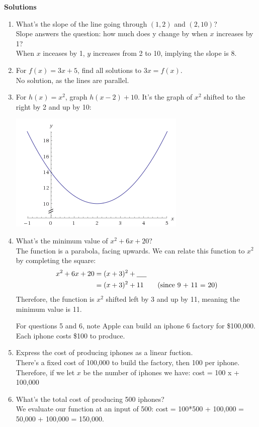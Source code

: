 \documentclass[a4paper, 12pt]{article}
\newcommand{\bt}[1]{\textbf{#1}} %
\newcommand{\eq}[1]{\begin{align*}#1\end{align*}} %
\renewcommand{\eq}[1]{\begin{align*}#1\end{align*}} %
\newcommand{\green}[1]{\textcolor{javagreen}{#1}} %
\begin{document}
\centerline{\bt{Solutions}}
\begin{enumerate}
    \item What's the slope of the line going through $(1, 2)$ and $(2, 10)$?\\
    \green{
    Slope answers the question: how much does y change by when $x$ increases by 1?\\
    When $x$ inceases by 1, $y$ increases from 2 to 10, implying the slope is 8.
    }

    \item For $f(x) = 3x + 5$, find all solutions to $3x = f(x)$. \\
    \green{
    No solution, as the lines are parallel.
    }
    \item For $h(x) = x^2$, graph $h(x-2) + 10$.
    \green{
    It's the graph of $x^2$ shifted to the right by 2 and up by 10:
    }

    \includegraphics{graphs/x2_right_up.png}
    \item What's the minimum value of $x^2 + 6x + 20$? \\
    \green{
    The function is a parabola, facing upwards. We can relate this function to $x^2$ by completing the square:
    \eq{
    x^2 + 6x + 20 & = (x+3)^2 + \text{\underline{\hspace{0.5cm}}} \\
    & = (x+3)^2 + 11 \tag{since 9 + 11 = 20}
    }
    Therefore, the function is $x^2$ shifted left by 3 and up by 11, meaning the minimum value is 11.
    }


   For questions 5 and 6, note Apple can build an iphone 6 factory for \$100,000. Each iphone costs \$100 to produce. 
    \item Express the cost of producing iphones as a linear fuction. \\
    \green{
    There's a fixed cost of 100,000 to build the factory, then 100 per iphone. Therefore, if we let $x$ be the number of iphones we have: 
    cost = 100 x + 100,000
    }
    \item What's the total cost of producing 500 iphones? \\
    \green{
    We evaluate our function at an input of 500: 
    cost = 100*500 + 100,000 = 50,000 + 100,000 = 150,000.
    }
\end{enumerate}
\end{document}
